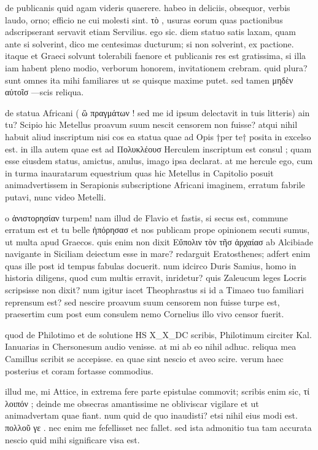  de publicanis quid agam videris quaerere. habeo in deliciis, obsequor, verbis laudo, orno; efficio ne cui molesti sint. τὸ , usuras eorum quas pactionibus adscripserant servavit etiam Servilius. ego sic. diem statuo satis laxam, quam ante si solverint, dico me centesimas ducturum; si non solverint, ex pactione. itaque et Graeci solvunt tolerabili faenore et publicanis res est gratissima, si illa iam habent pleno modio, verborum honorem, invitationem crebram. quid plura? sunt omnes ita mihi familiares ut se quisque maxime putet. sed tamen μηδὲν αὐτοῖσ —scis reliqua.

 de statua Africani ( ὢ πραγμάτων ! sed me id ipsum delectavit in tuis litteris) ain tu? Scipio hic Metellus proavum suum nescit censorem non fuisse? atqui nihil habuit aliud inscriptum nisi cos ea statua quae ad Opis †per te† posita in excelso est. in illa autem quae est ad Πολυκλέουσ Herculem inscriptum est consul ; quam esse eiusdem status, amictus, anulus, imago ipsa declarat. at me hercule ego, cum in turma inauratarum equestrium quas hic Metellus in Capitolio posuit animadvertissem in Serapionis subscriptione Africani imaginem, erratum fabrile putavi, nunc video Metelli.

 o ἀνιστορησίαν turpem! nam illud de Flavio et fastis, si secus est, commune erratum est et tu belle ἠπόρησασ et nos publicam prope opinionem secuti sumus, ut multa apud Graecos. quis enim non dixit Εὔπολιν τὸν τῆσ ἀρχαίασ ab Alcibiade navigante in Siciliam deiectum esse in mare? redarguit Eratosthenes; adfert enim quas ille post id tempus fabulas docuerit. num idcirco Duris Samius, homo in historia diligens, quod cum multis erravit, inridetur? quis Zaleucum leges Locris scripsisse non dixit? num igitur iacet Theophrastus si id a Timaeo tuo familiari reprensum est? sed nescire proavum suum censorem non fuisse turpe est, praesertim cum post eum consulem nemo Cornelius illo vivo censor fuerit.

 quod de Philotimo et de solutione HS X_X_DC scribis, Philotimum circiter Kal. Ianuarias in Chersonesum audio venisse. at mi ab eo nihil adhuc. reliqua mea Camillus scribit se accepisse. ea quae sint nescio et aveo scire. verum haec posterius et coram fortasse commodius.

 illud me, mi Attice, in extrema fere parte epistulae commovit; scribis enim sic, τί λοιπόν ; deinde me obsecras amantissime ne obliviscar vigilare et ut animadvertam quae fiant. num quid de quo inaudisti? etsi nihil eius modi est. πολλοῦ γε . nec enim me fefellisset nec fallet. sed ista admonitio tua tam accurata nescio quid mihi significare visa est.

